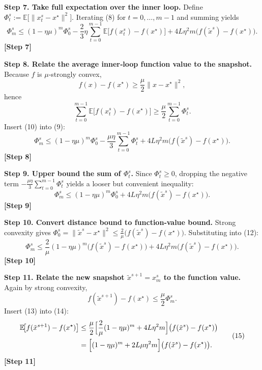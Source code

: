 \documentclass{article}
\newcommand{\E}{\mathbb{E}}
\begin{document}
\medskip
\noindent\textbf{Step 7. Take full expectation over the inner loop.}  
Define $\Phi_{t}^{s}:=\E\bigl[\|x_{t}^{s}-x^{\star}\|^{2}\bigr]$. Iterating (8) for $t=0,\dots,m-1$ and summing yields
\[
\Phi_{m}^{s}
\le (1-\eta\mu)^{m}\Phi_{0}^{s}
   -\frac{2}{3}\eta\sum_{t=0}^{m-1}\E\!\bigl[f(x_{t}^{s})-f(x^{\star})\bigr]
   +4L\eta^{2}m\bigl(f(\tilde{x}^{s})-f(x^{\star})\bigr). \tag{9}
\]
\textbf{[Step 7]}

\medskip
\noindent\textbf{Step 8. Relate the average inner‑loop function value to the snapshot.}  
Because $f$ is $\mu$‑strongly convex,
\[
f(x)-f(x^{\star})\ge\frac{\mu}{2}\|x-x^{\star}\|^{2},
\]
hence
\[
\sum_{t=0}^{m-1}\E\!\bigl[f(x_{t}^{s})-f(x^{\star})\bigr]
\ge \frac{\mu}{2}\sum_{t=0}^{m-1}\Phi_{t}^{s}. \tag{10}
\]
Insert (10) into (9):
\[
\Phi_{m}^{s}
\le (1-\eta\mu)^{m}\Phi_{0}^{s}
   -\frac{\mu\eta}{3}\sum_{t=0}^{m-1}\Phi_{t}^{s}
   +4L\eta^{2}m\bigl(f(\tilde{x}^{s})-f(x^{\star})\bigr). \tag{11}
\]
\textbf{[Step 8]}

\medskip
\noindent\textbf{Step 9. Upper bound the sum of $\Phi_{t}^{s}$.}  
Since $\Phi_{t}^{s}\ge0$, dropping the negative term $-\frac{\mu\eta}{3}\sum_{t=0}^{m-1}\Phi_{t}^{s}$ yields a looser but convenient inequality:
\[
\Phi_{m}^{s}\le (1-\eta\mu)^{m}\Phi_{0}^{s}
   +4L\eta^{2}m\bigl(f(\tilde{x}^{s})-f(x^{\star})\bigr). \tag{12}
\]
\textbf{[Step 9]}

\medskip
\noindent\textbf{Step 10. Convert distance bound to function‑value bound.}  
Strong convexity gives $\Phi_{0}^{s}= \| \tilde{x}^{s}-x^{\star}\|^{2}\le \frac{2}{\mu}\bigl(f(\tilde{x}^{s})-f(x^{\star})\bigr)$. Substituting into (12):
\[
\Phi_{m}^{s}\le
\frac{2}{\mu}(1-\eta\mu)^{m}\bigl(f(\tilde{x}^{s})-f(x^{\star})\bigr)
   +4L\eta^{2}m\bigl(f(\tilde{x}^{s})-f(x^{\star})\bigr). \tag{13}
\]
\textbf{[Step 10]}

\medskip
\noindent\textbf{Step 11. Relate the new snapshot $\tilde{x}^{s+1}=x_{m}^{s}$ to the function value.}  
Again by strong convexity,
\[
f(\tilde{x}^{s+1})-f(x^{\star})
\le \frac{\mu}{2}\Phi_{m}^{s}. \tag{14}
\]
Insert (13) into (14):
\[
\begin{aligned}
\E\!\bigl[f(\tilde{x}^{s+1})-f(x^{\star})\bigr]
 &\le \frac{\mu}{2}\Bigl[
      \frac{2}{\mu}(1-\eta\mu)^{m}
      +4L\eta^{2}m\Bigr]\bigl(f(\tilde{x}^{s})-f(x^{\star})\bigr)\\
 &=
 \Bigl[(1-\eta\mu)^{m}+2L\mu\eta^{2}m\Bigr]\bigl(f(\tilde{x}^{s})-f(x^{\star})\bigr).
\end{aligned}
\tag{15}
\]
\textbf{[Step 11]}
\end{document}
